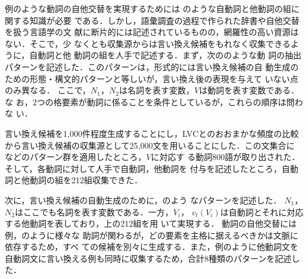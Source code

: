 例のような動詞の自他交替を実現するためには
のような自動詞と他動詞の組に関する知識が必要
である．しかし，語彙調査の過程で作られた辞書や自他交替を扱う言語学の文
献に断片的には記述されているものの，網羅性の高い資源はない．そこで，少
なくとも収集源からは言い換え候補をもれなく収集できるように，自動詞と他
動詞の組を人手で記述する．まず，次ののような動
詞の抽出パターンを記述した．このパターンは，形式的には言い換え候補の自
動生成のための形態・構文的パターンと等しいが，言い換え後の表現を与えて
いない点のみ異なる．
ここで，$N_{1}$，$N_{2}$は名詞を表す変数，$V$は動詞を表す変数である．な
お，2つの格要素が動詞に係ることを条件としているが，これらの順序は問わな
い．

言い換え候補を1,000件程度生成することにし，LVCとのおおまかな頻度の比較
から言い換え候補の収集源として25,000文を用いることにした．この文集合に
などのパターン群を適用したところ，$V$に対応す
る動詞800語が取り出された．そして，各動詞に対して人手で自動詞，他動詞を
付与を記述したところ，自動詞と他動詞の組を212組収集できた．

次に，言い換え候補の自動生成のために，のよう
なパターンを記述した．
$N_{1}$，$N_{2}$はここでも名詞を表す変数である．一方，$V_{i}$，
$v_{t}(V_{i})$は自動詞とそれに対応する他動詞を表しており，上の212組を用
いて実現する．
動詞の自他交替には例，のように様々な
助詞が関わるが，どの要素を主格に据えるべきかは文脈に依存するため，すべ
ての候補を別々に生成する．また，例のように他動詞文を
自動詞文に言い換える例も同時に収集するため，合計8種類のパターンを記述し
た．


